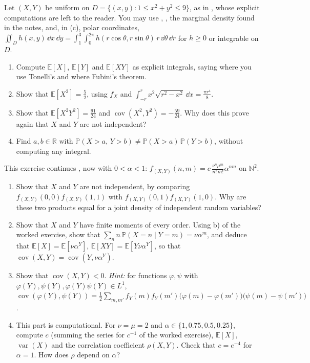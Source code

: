 \begin{exercise}\label{ex:tr-annulus}
\easy Let $(X,Y)$ be uniform on $D=\{(x,y):1\le x^2+y^2\le9\}$, as in ,
whose explicit computations are left to the reader. You may use ,
, the marginal density found in the notes, and, in (c), polar coordinates,
$\iint_Dh(x,y)\,\dd x\,\dd y=\int_1^3\int_0^{2\pi}h(r\cos\theta,r\sin\theta)\,r\,\dd\theta\,\dd r$
for $h\ge0$ or integrable on $D$.
\begin{enumerate}[label=(\alph*)]
  \item Compute $\mathbb E[X]$, $\mathbb E[Y]$ and $\mathbb E[XY]$ as explicit integrals, saying
    where you use Tonelli's and where Fubini's theorem.
  \item Show that $\mathbb E[X^2]=\frac52$, using $f_X$ and $\int_{-r}^rx^2\sqrt{r^2-x^2}\,\dd x=\frac{\pi r^4}8$.
  \item Show that $\mathbb E[X^2Y^2]=\frac{91}{24}$ and $\operatorname{cov}(X^2,Y^2)=-\frac{59}{24}$.
    Why does this prove again that $X$ and $Y$ are not independent?
  \item Find $a,b\in\mathbb R$ with $\mathbb P(X>a,\,Y>b)\ne\mathbb P(X>a)\,\mathbb P(Y>b)$,
    without computing any integral.
\end{enumerate}
\end{exercise}

\begin{exercise}\label{ex:tr-poisson-conditionals}
\medium This exercise continues , now with $0<\alpha<1$:
$f_{(X,Y)}(n,m)=c\,\frac{\nu^n\mu^m}{n!\,m!}\alpha^{nm}$ on $\mathbb N^2$.
\begin{enumerate}[label=(\alph*)]
  \item Show that $X$ and $Y$ are not independent, by comparing $f_{(X,Y)}(0,0)f_{(X,Y)}(1,1)$ with
    $f_{(X,Y)}(0,1)f_{(X,Y)}(1,0)$. Why are these two products equal for a joint density of
    independent random variables?
  \item Show that $X$ and $Y$ have finite moments of every order. Using b) of the worked
    exercise, show that $\sum_nn\,\mathbb P(X=n\mid Y=m)=\nu\alpha^m$, and deduce that
    $\mathbb E[X]=\mathbb E[\nu\alpha^Y]$, $\mathbb E[XY]=\mathbb E[Y\nu\alpha^Y]$, so that
    $\operatorname{cov}(X,Y)=\operatorname{cov}(Y,\nu\alpha^Y)$.
  \item Show that $\operatorname{cov}(X,Y)<0$. \emph{Hint:} for functions $\varphi,\psi$ with
    $\varphi(Y),\psi(Y),\varphi(Y)\psi(Y)\in L^1$,
    $\operatorname{cov}(\varphi(Y),\psi(Y))=\frac12\sum_{m,m'}f_Y(m)f_Y(m')\big(\varphi(m)-\varphi(m')\big)\big(\psi(m)-\psi(m')\big)$.
  \item This part is computational. For $\nu=\mu=2$ and $\alpha\in\{1,0.75,0.5,0.25\}$, compute
    $c$ (summing the series for $c^{-1}$ of the worked exercise), $\mathbb E[X]$,
    $\operatorname{var}(X)$ and the correlation coefficient $\rho(X,Y)$. Check that
    $c=e^{-4}$ for $\alpha=1$. How does $\rho$ depend on $\alpha$?
\end{enumerate}
\end{exercise}

